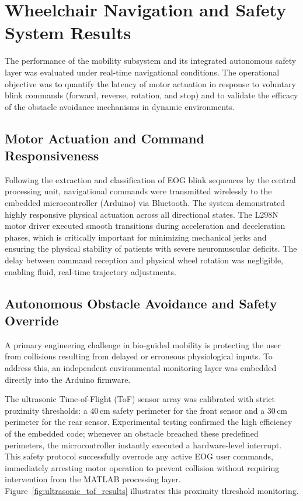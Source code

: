 \section{Wheelchair Navigation and Safety System Results}
\label{sec:wheelchair_navigation_safety_results}

The performance of the mobility subsystem and its integrated autonomous safety layer was evaluated under real-time navigational conditions. The operational objective was to quantify the latency of motor actuation in response to voluntary blink commands (forward, reverse, rotation, and stop) and to validate the efficacy of the obstacle avoidance mechanisms in dynamic environments.

\FloatBarrier
\subsection{Motor Actuation and Command Responsiveness}
\label{subsec:motor_actuation_responsiveness}

Following the extraction and classification of EOG blink sequences by the central processing unit, navigational commands were transmitted wirelessly to the embedded microcontroller (Arduino) via Bluetooth. The system demonstrated highly responsive physical actuation across all directional states. The L298N motor driver executed smooth transitions during acceleration and deceleration phases, which is critically important for minimizing mechanical jerks and ensuring the physical stability of patients with severe neuromuscular deficits. The delay between command reception and physical wheel rotation was negligible, enabling fluid, real-time trajectory adjustments.

\FloatBarrier
\subsection{Autonomous Obstacle Avoidance and Safety Override}
\label{subsec:autonomous_obstacle_avoidance}

A primary engineering challenge in bio-guided mobility is protecting the user from collisions resulting from delayed or erroneous physiological inputs. To address this, an independent environmental monitoring layer was embedded directly into the Arduino firmware.

The ultrasonic Time-of-Flight (ToF) sensor array was calibrated with strict proximity thresholds: a $40\,\text{cm}$ safety perimeter for the front sensor and a $30\,\text{cm}$ perimeter for the rear sensor. Experimental testing confirmed the high efficiency of the embedded code; whenever an obstacle breached these predefined perimeters, the microcontroller instantly executed a hardware-level interrupt. This safety protocol successfully overrode any active EOG user commands, immediately arresting motor operation to prevent collision without requiring intervention from the MATLAB processing layer. Figure~\ref{fig:ultrasonic_tof_results} illustrates this proximity threshold monitoring.

